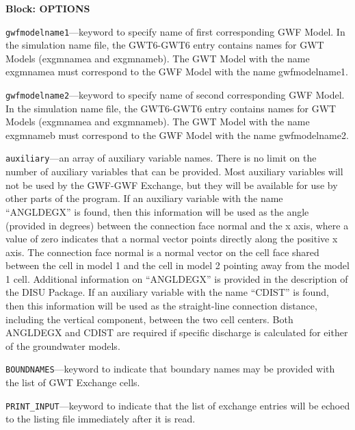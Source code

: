 
\item \textbf{Block: OPTIONS}

\begin{description}
\item \texttt{gwfmodelname1}---keyword to specify name of first corresponding GWF Model.  In the simulation name file, the GWT6-GWT6 entry contains names for GWT Models (exgmnamea and exgmnameb).  The GWT Model with the name exgmnamea must correspond to the GWF Model with the name gwfmodelname1.

\item \texttt{gwfmodelname2}---keyword to specify name of second corresponding GWF Model.  In the simulation name file, the GWT6-GWT6 entry contains names for GWT Models (exgmnamea and exgmnameb).  The GWT Model with the name exgmnameb must correspond to the GWF Model with the name gwfmodelname2.

\item \texttt{auxiliary}---an array of auxiliary variable names.  There is no limit on the number of auxiliary variables that can be provided. Most auxiliary variables will not be used by the GWF-GWF Exchange, but they will be available for use by other parts of the program.  If an auxiliary variable with the name ``ANGLDEGX'' is found, then this information will be used as the angle (provided in degrees) between the connection face normal and the x axis, where a value of zero indicates that a normal vector points directly along the positive x axis.  The connection face normal is a normal vector on the cell face shared between the cell in model 1 and the cell in model 2 pointing away from the model 1 cell.  Additional information on ``ANGLDEGX'' is provided in the description of the DISU Package.  If an auxiliary variable with the name ``CDIST'' is found, then this information will be used as the straight-line connection distance, including the vertical component, between the two cell centers.  Both ANGLDEGX and CDIST are required if specific discharge is calculated for either of the groundwater models.

\item \texttt{BOUNDNAMES}---keyword to indicate that boundary names may be provided with the list of GWT Exchange cells.

\item \texttt{PRINT\_INPUT}---keyword to indicate that the list of exchange entries will be echoed to the listing file immediately after it is read.


\end{description}
